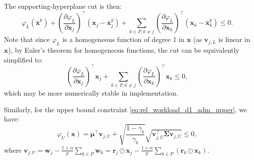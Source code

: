 \documentclass[preprint,12pt,authoryear]{elsarticle}
\begin{document}
The supporting-hyperplane cut is then:
\begin{equation}
\varphi_L(\bar{\mathbf{x}}^k) + \left(\frac{\partial \varphi_L}{\partial \mathbf{x}_j}\right)^\top (\mathbf{x}_j - \bar{\mathbf{x}}_j^k) + \sum_{k \in P, k \neq j} \left(\frac{\partial \varphi_L}{\partial \mathbf{x}_k}\right)^\top (\mathbf{x}_k - \bar{\mathbf{x}}_k^k) \leqslant 0.
\label{eq:rel_workload_d1_supporting_cut_lower}
\end{equation}
Note that since $\varphi_L$ is a homogeneous function of degree 1 in $\mathbf{x}$ (as $\mathbf{v}_{j,L}$ is linear in $\mathbf{x}$), by Euler's theorem for homogeneous functions, the cut can be equivalently simplified to:
\begin{equation}
\left(\frac{\partial \varphi_L}{\partial \mathbf{x}_j}\right)^\top \mathbf{x}_j + \sum_{k \in P, k \neq j} \left(\frac{\partial \varphi_L}{\partial \mathbf{x}_k}\right)^\top \mathbf{x}_k \leqslant 0,
\end{equation}
which may be more numerically stable in implementation.

Similarly, for the upper bound constraint \eqref{eq:rel_workload_d1_adm_upper}, we have:
\begin{equation}
\varphi_U(\mathbf{x}) = \boldsymbol{\mu}^\top \mathbf{v}_{j,U} + \sqrt{\frac{1-\gamma_b}{\gamma_b}} \sqrt{\mathbf{v}_{j,U}^\top \boldsymbol{\Sigma} \mathbf{v}_{j,U}} \leqslant 0,
\label{eq:rel_workload_phi_U}
\end{equation}
where $\mathbf{v}_{j,U} = \mathbf{w}_j - \frac{1+\alpha}{p} \sum_{k \in P} \mathbf{w}_k = \mathbf{r}_j \odot \mathbf{x}_j - \frac{1+\alpha}{p} \sum_{k \in P} (\mathbf{r}_k \odot \mathbf{x}_k)$.
\end{document}
